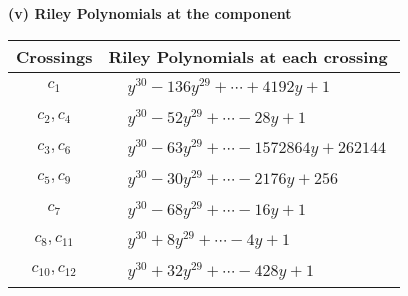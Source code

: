 \documentclass[1p]{elsarticle_modified}
\theoremstyle{definition}
\begin{document}
\flushleft \textbf{(v) Riley Polynomials at the component}\newline \\
\begin{tabular}{m{50pt}|m{274pt}}
Crossings & \hspace{64pt}Riley Polynomials at each crossing \\
\hline $$\begin{aligned}c_{1}\end{aligned}$$&$\begin{aligned}
&y^{30}-136 y^{29}+\cdots+4192 y+1
\end{aligned}$\\
\hline $$\begin{aligned}c_{2},c_{4}\end{aligned}$$&$\begin{aligned}
&y^{30}-52 y^{29}+\cdots-28 y+1
\end{aligned}$\\
\hline $$\begin{aligned}c_{3},c_{6}\end{aligned}$$&$\begin{aligned}
&y^{30}-63 y^{29}+\cdots-1572864 y+262144
\end{aligned}$\\
\hline $$\begin{aligned}c_{5},c_{9}\end{aligned}$$&$\begin{aligned}
&y^{30}-30 y^{29}+\cdots-2176 y+256
\end{aligned}$\\
\hline $$\begin{aligned}c_{7}\end{aligned}$$&$\begin{aligned}
&y^{30}-68 y^{29}+\cdots-16 y+1
\end{aligned}$\\
\hline $$\begin{aligned}c_{8},c_{11}\end{aligned}$$&$\begin{aligned}
&y^{30}+8 y^{29}+\cdots-4 y+1
\end{aligned}$\\
\hline $$\begin{aligned}c_{10},c_{12}\end{aligned}$$&$\begin{aligned}
&y^{30}+32 y^{29}+\cdots-428 y+1
\end{aligned}$\\
\hline
\end{tabular}\\~\\
\end{document}
